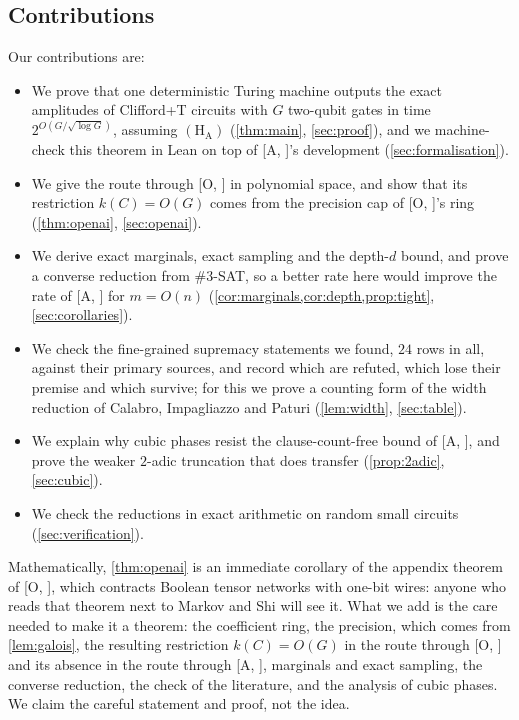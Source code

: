 \documentclass[10pt]{amsart}
\theoremstyle{plain}
\theoremstyle{definition}
\theoremstyle{remark}
\numberwithin{equation}{section}
\newcommand{\A}[1][]{\textup{[A\if\relax\detokenize{#1}\relax\else, #1\fi]}}
\newcommand{\Oa}[1][]{\textup{[O\if\relax\detokenize{#1}\relax\else, #1\fi]}}
\begin{document}
\subsection{Contributions}
Our contributions are:
\begin{itemize}
\item We prove that one deterministic Turing machine outputs the exact amplitudes of Clifford+T
circuits with $G$ two-qubit gates in time $2^{O(G/\sqrt{\log G})}$, assuming $(\mathrm{H}_{\mathrm{A}})$
(\cref{thm:main}, \cref{sec:proof}), and we machine-check this theorem in Lean on top of \A's
development (\cref{sec:formalisation}).
\item We give the route through \Oa{} in polynomial space, and show that its restriction $k(C)=O(G)$
comes from the precision cap of \Oa's ring (\cref{thm:openai}, \cref{sec:openai}).
\item We derive exact marginals, exact sampling and the depth-$d$ bound, and prove a converse
reduction from $\#3$-SAT, so a better rate here would improve the rate of \A{} for $m=O(n)$
(\cref{cor:marginals,cor:depth,prop:tight}, \cref{sec:corollaries}).
\item We check the fine-grained supremacy statements we found, $24$ rows in all, against their primary
sources, and record which are refuted, which lose their premise and which survive; for this we prove a
counting form of the width reduction of Calabro, Impagliazzo and Paturi (\cref{lem:width},
\cref{sec:table}).
\item We explain why cubic phases resist the clause-count-free bound of \A, and prove the weaker
$2$-adic truncation that does transfer (\cref{prop:2adic}, \cref{sec:cubic}).
\item We check the reductions in exact arithmetic on random small circuits (\cref{sec:verification}).
\end{itemize}
Mathematically, \cref{thm:openai} is an immediate corollary of the appendix theorem of \Oa, which
contracts Boolean tensor networks with one-bit wires: anyone who reads that theorem next to Markov and
Shi will see it. What we add is the care needed to make it a theorem: the coefficient ring, the
precision, which comes from \cref{lem:galois}, the resulting restriction $k(C)=O(G)$ in the route
through \Oa{} and its absence in the route through \A, marginals and exact sampling, the converse
reduction, the check of the literature, and the analysis of cubic phases. We claim the careful
statement and proof, not the idea.
\end{document}
